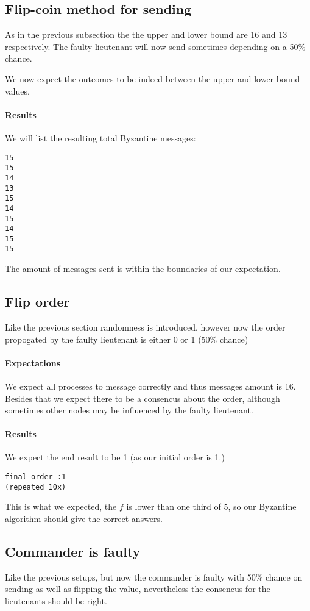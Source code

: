\documentclass{article}
\begin{document}
\subsection{Flip-coin method for sending}
As in the previous subsection the the upper and lower bound are 16 and
13 respectively. The faulty lieutenant will now send sometimes
depending on a 50\% chance.

We now expect the outcomes to be indeed between the upper and lower
bound values.
\paragraph{Results}
We will list the resulting total Byzantine messages:
\begin{lstlisting}
15
15
14
13
15
14
15
14
15
15

\end{lstlisting}
The amount of messages sent is within the boundaries of our expectation.
\subsection{Flip order}
Like the previous section randomness is introduced, however now the
order propogated by the faulty lieutenant is either 0 or 1 (50\%
chance)

\paragraph{Expectations}
We expect all processes to message correctly and thus messages amount
is 16.  Besides that we expect there to be a consencus about the
order, although sometimes other nodes may be influenced by the faulty
lieutenant.

\paragraph{Results}
We expect the end result to be 1 (as our initial order is 1.)
\begin{lstlisting}
final order :1
(repeated 10x)
\end{lstlisting}
This is what we expected, the $f$ is lower than one third of 5, so our
Byzantine algorithm should give the correct answers.

\subsection{Commander is faulty}
Like the previous setups, but now the commander is faulty with 50\%
chance on sending as well as flipping the value, nevertheless the
consencus for the lieutenants should be right.
\end{document}
